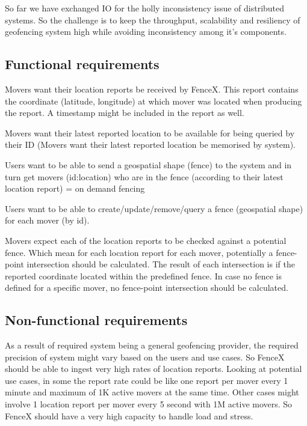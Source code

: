 \documentclass[a4]{report}
\begin{document}
        So far we have exchanged IO for the holly inconsistency issue of distributed systems.
        So the challenge is to keep the throughput, scalability and resiliency of geofencing system high while avoiding
        inconsistency among it's components.

        \subsection{Functional requirements}
        Movers want their location reports be received by FenceX.
        This report contains the coordinate (latitude, longitude) at which mover was located when producing the report.
        A timestamp might be included in the report as well.

        Movers want their latest reported location to be available for being queried by their ID (Movers want their
        latest reported location be memorised by system).

        Users want to be able to send a geospatial shape (fence) to the system and in turn get movers (id:location) who
        are in the fence (according to their latest location report) = on demand fencing

        Users want to be able to create/update/remove/query a fence (geospatial shape) for each mover (by id).

        Movers expect each of the location reports to be checked against a potential fence.
        Which mean for each location report for each mover, potentially a fence-point intersection should be calculated.
        The result of each intersection is if the reported coordinate located within the predefined fence.
        In case no fence is defined for a specific mover, no fence-point intersection should be calculated.

        \subsection{Non-functional requirements}
        As a result of required system being a general geofencing provider, the required precision of system might vary
        based on the users and use cases.
        So FenceX should be able to ingest very high rates of location reports.
        Looking at potential use cases, in some the report rate could be like one report per mover every 1 minute and
        maximum of 1K active movers at the same time.
        Other cases might involve 1 location report per mover every 5 second with 1M active movers.
        So FenceX should have a very high capacity to handle load and stress.
\end{document}
